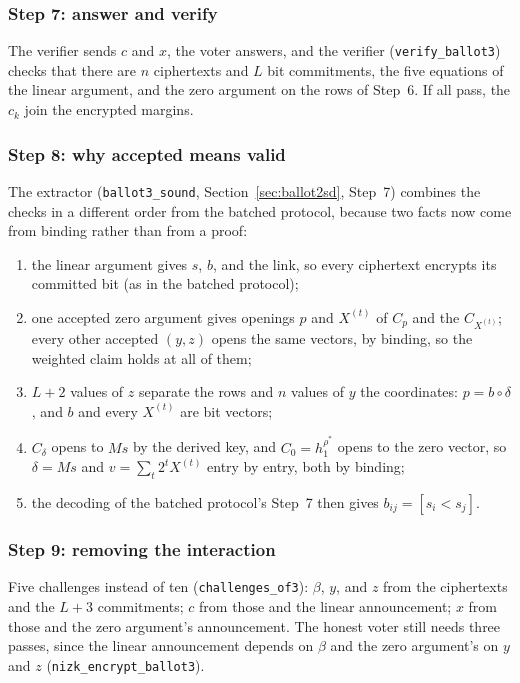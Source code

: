 \documentclass[11pt,a4paper]{article}
\newcommand{\rocq}[1]{\texttt{#1}}
\theoremstyle{remark}
\begin{document}
\subsubsection*{Step 7: answer and verify}
The verifier sends $c$ and $x$, the voter answers, and the verifier
(\rocq{verify\_ballot3}) checks that there are $n$ ciphertexts and $L$
bit commitments, the five equations of the linear argument, and the zero
argument on the rows of Step~6. If all pass, the $c_k$ join the
encrypted margins.

\subsubsection*{Step 8: why accepted means valid}
The extractor (\rocq{ballot3\_sound}, Section~\ref{sec:ballot2sd},
Step~7) combines the checks in a different order from the batched
protocol, because two facts now come from binding rather than from a
proof:
\begin{enumerate}[nosep]
  \item the linear argument gives $s$, $b$, and the link, so every
  ciphertext encrypts its committed bit (as in the batched protocol);
  \item one accepted zero argument gives openings $p$ and $X^{(t)}$ of
  $C_p$ and the $C_{X^{(t)}}$; every other accepted $(y, z)$ opens the same
  vectors, by binding, so the weighted claim holds at all of them;
  \item $L + 2$ values of $z$ separate the rows and $n$ values of $y$ the
  coordinates: $p = b \circ \delta$, and $b$ and every $X^{(t)}$ are bit
  vectors;
  \item $C_\delta$ opens to $Ms$ by the derived key, and $C_0 = h_1^{\rho^*}$
  opens to the zero vector, so $\delta = Ms$ and $v = \sum_t 2^t X^{(t)}$
  entry by entry, both by binding;
  \item the decoding of the batched protocol's Step~7 then gives $b_{ij}
  = [s_i < s_j]$.
\end{enumerate}

\subsubsection*{Step 9: removing the interaction}
Five challenges instead of ten (\rocq{challenges\_of3}): $\beta$, $y$,
and $z$ from the ciphertexts and the $L + 3$ commitments; $c$ from those
and the linear announcement; $x$ from those and the zero argument's
announcement. The honest voter still needs three passes, since the linear
announcement depends on $\beta$ and the zero argument's on $y$ and $z$
(\rocq{nizk\_encrypt\_ballot3}).
\end{document}
